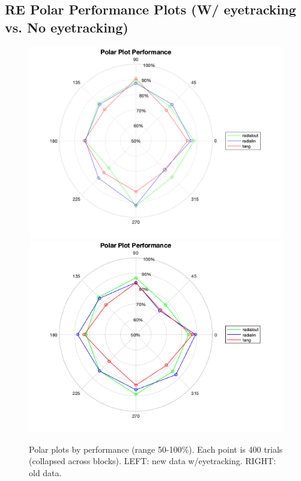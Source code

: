 \documentclass[11pt]{article} %
\begin{document}
\subsection{RE Polar Performance Plots (W/ eyetracking vs. No eyetracking)}
\begin{figure}[H]
\centering %
\includegraphics[scale=.18]{Images/polarplot_new.png}
\includegraphics[scale=.35]{Images/performance_polarplot.png}
\caption{Polar plots by performance (range 50-100\%). Each point is 400 trials (collapsed across blocks). LEFT: new data w/eyetracking. RIGHT: old data.}
\end{figure}
\end{document}
